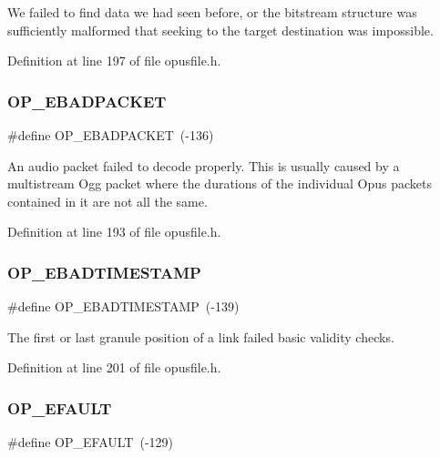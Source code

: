 We failed to find data we had seen before, or the bitstream structure was sufficiently malformed that seeking to the target destination was impossible. 

Definition at line 197 of file opusfile.\+h.

\mbox{\label{group__error__codes_gaa3fa0a3e6facc4f47924271e65bb21ff}} 
\subsubsection{\texorpdfstring{OP\_EBADPACKET}{OP\_EBADPACKET}}
{\footnotesize\ttfamily \#define O\+P\+\_\+\+E\+B\+A\+D\+P\+A\+C\+K\+ET~(-\/136)}

An audio packet failed to decode properly. This is usually caused by a multistream Ogg packet where the durations of the individual Opus packets contained in it are not all the same. 

Definition at line 193 of file opusfile.\+h.

\mbox{\label{group__error__codes_gaf82657fc888f1dcf2e0d8f066b8a6cc7}} 
\subsubsection{\texorpdfstring{OP\_EBADTIMESTAMP}{OP\_EBADTIMESTAMP}}
{\footnotesize\ttfamily \#define O\+P\+\_\+\+E\+B\+A\+D\+T\+I\+M\+E\+S\+T\+A\+MP~(-\/139)}

The first or last granule position of a link failed basic validity checks. 

Definition at line 201 of file opusfile.\+h.

\mbox{\label{group__error__codes_ga2ddb887c0bb55c74ea6be391fabcba59}} 
\subsubsection{\texorpdfstring{OP\_EFAULT}{OP\_EFAULT}}
{\footnotesize\ttfamily \#define O\+P\+\_\+\+E\+F\+A\+U\+LT~(-\/129)}

